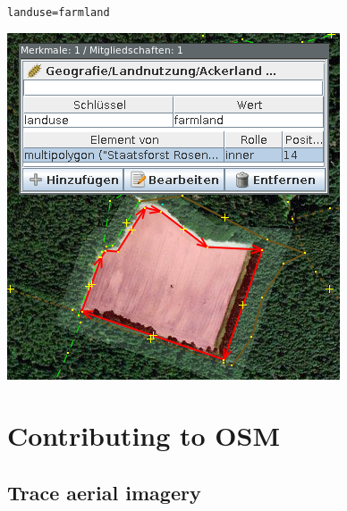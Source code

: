 \documentclass{beamer}
\begin{document}
\begin{frame}
\begin{center}
			\begin{minipage}[b][0.6\textheight][c]{0.3\linewidth}
				\texttt{landuse=farmland}
				\begin{center}
					\includegraphics[width=\linewidth,height=\textheight,keepaspectratio]{images/multipolygon_josm.png}
				\end{center}
			\end{minipage}
		\end{center}
	\end{frame}

	\section{Contributing to OSM}
	
	\subsection{Trace aerial imagery}
	
\end{document}
